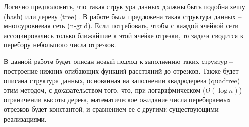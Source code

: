 Логично предположить, что такая структура данных должны быть
подобна хешу (hash) \cite{AHU} или дереву (tree) \cite{QT, SQT, FANN}. В работе \cite{NGRID} была предложена
такая структура данных -- многоуровневая сеть (n-grid). Если потребовать,
чтобы с каждой ячейкой сети ассоциировались только ближайшие к этой
ячейке отрезки, то задача сводится к перебору небольшого числа отрезков.

В данной работе будет описан новый подход к заполнению таких структур --
построение нижних огибающих функций расстояний до отрезков. Также будет описана
структура данных, основанная на заполнении квадродерева (quadtree) этим методом,
с доказательством того, что, при логарифмическом ($O(\log n)$) ограничении высоты дерева,
математическое ожидание числа перебираемых отрезков будет константой, и сравнением ее
с другими существующими реализациями.  

\FloatBarrier
